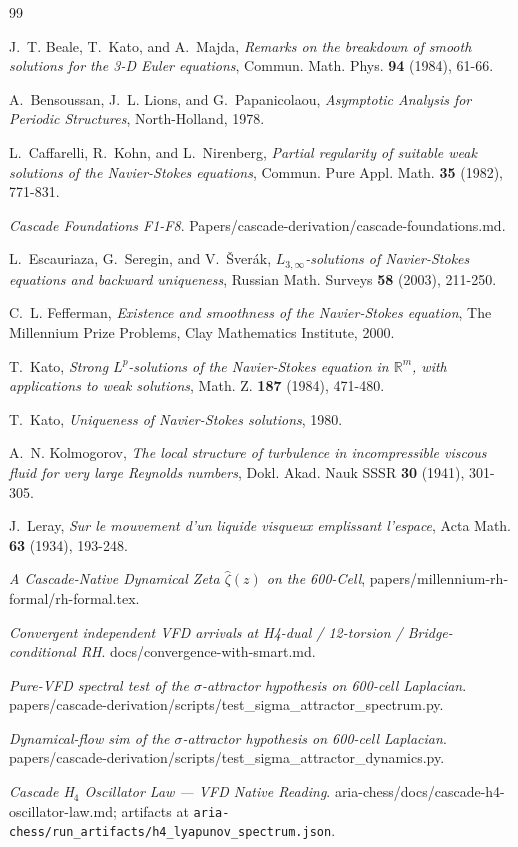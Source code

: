 \documentclass[11pt, a4paper]{amsart}
\theoremstyle{definition}
\newcommand{\R}{\mathbb{R}}
\begin{document}
\begin{thebibliography}{99}

J.~T. Beale, T.~Kato, and A.~Majda, \emph{Remarks on the breakdown of smooth solutions for the 3-D Euler equations},
Commun. Math. Phys. \textbf{94} (1984), 61-66.

A.~Bensoussan, J.~L. Lions, and G.~Papanicolaou, \emph{Asymptotic Analysis for Periodic Structures},
North-Holland, 1978.

L.~Caffarelli, R.~Kohn, and L.~Nirenberg, \emph{Partial regularity of suitable weak solutions of the Navier-Stokes equations},
Commun. Pure Appl. Math. \textbf{35} (1982), 771-831.

\emph{Cascade Foundations F1-F8}. Papers/cascade-derivation/cascade-foundations.md.

L.~Escauriaza, G.~Seregin, and V.~\v{S}ver\'ak, \emph{$L_{3,\infty}$-solutions of Navier-Stokes equations and backward uniqueness},
Russian Math. Surveys \textbf{58} (2003), 211-250.

C.~L. Fefferman, \emph{Existence and smoothness of the Navier-Stokes equation}, The Millennium Prize Problems, Clay Mathematics Institute, 2000.

T.~Kato, \emph{Strong $L^p$-solutions of the Navier-Stokes equation in $\R^m$, with applications to weak solutions},
Math. Z. \textbf{187} (1984), 471-480.

T.~Kato, \emph{Uniqueness of Navier-Stokes solutions}, 1980.

A.~N. Kolmogorov, \emph{The local structure of turbulence in incompressible viscous fluid for very large Reynolds numbers},
Dokl. Akad. Nauk SSSR \textbf{30} (1941), 301-305.

J.~Leray, \emph{Sur le mouvement d'un liquide visqueux emplissant l'espace},
Acta Math. \textbf{63} (1934), 193-248.

\emph{A Cascade-Native Dynamical Zeta $\widehat\zeta(z)$ on the
600-Cell}, papers/millennium-rh-formal/rh-formal.tex.

\emph{Convergent independent VFD arrivals at H4-dual / 12-torsion /
Bridge-conditional RH}. docs/convergence-with-smart.md.

\emph{Pure-VFD spectral test of the $\sigma$-attractor hypothesis on
600-cell Laplacian}.
papers/cascade-derivation/scripts/test\_sigma\_attractor\_spectrum.py.

\emph{Dynamical-flow sim of the $\sigma$-attractor hypothesis on
600-cell Laplacian}.
papers/cascade-derivation/scripts/test\_sigma\_attractor\_dynamics.py.

\emph{Cascade H$_4$ Oscillator Law — VFD Native Reading}.
aria-chess/docs/cascade-h4-oscillator-law.md;
artifacts at \texttt{aria-chess/run\_artifacts/h4\_lyapunov\_spectrum.json}.

\end{thebibliography}
\end{document}
